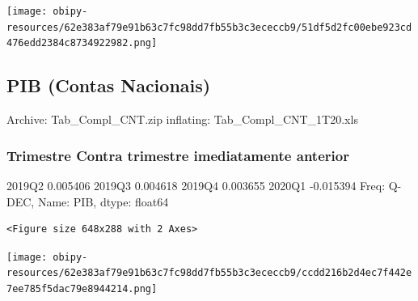 \documentclass[11pt]{article}
\begin{document}
\begin{center}
\texttt{[image: obipy-resources/62e383af79e91b63c7fc98dd7fb55b3c3ececcb9/51df5d2fc00ebe923cd476edd2384c8734922982.png]}
\end{center}

\subsection{PIB (Contas Nacionais)}
\label{sec:org264744b}

Archive:  Tab\_Compl\_CNT.zip
  inflating: Tab\_Compl\_CNT\_1T20.xls  

\subsubsection{Trimestre Contra trimestre imediatamente anterior}
\label{sec:orgcfcbca0}

2019Q2    0.005406
2019Q3    0.004618
2019Q4    0.003655
2020Q1   -0.015394
Freq: Q-DEC, Name: PIB, dtype: float64

\begin{verbatim}
<Figure size 648x288 with 2 Axes>
\end{verbatim}


\begin{center}
\texttt{[image: obipy-resources/62e383af79e91b63c7fc98dd7fb55b3c3ececcb9/ccdd216b2d4ec7f442e7ee785f5dac79e8944214.png]}
\end{center}
\end{document}
